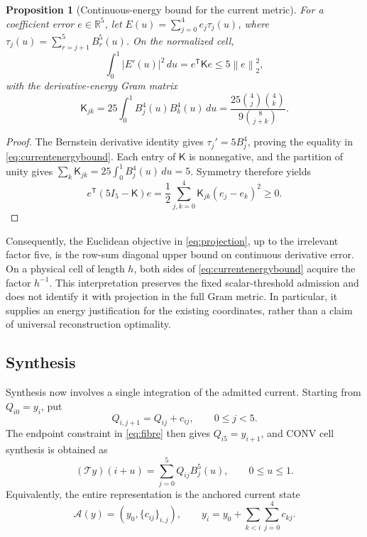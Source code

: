 \documentclass[journal]{IEEEtran}
\newtheorem{proposition}{Proposition}
\newcommand{\R}{\mathbb{R}}
\newcommand{\Tcal}{\mathcal{T}}
\newcommand{\Acal}{\mathcal{A}}
\newcommand{\norm}[1]{\left\lVert#1\right\rVert}
\begin{document}
\begin{proposition}[Continuous-energy bound for the current metric]
For a coefficient error \(e\in\R^5\), let
\(E(u)=\sum_{j=0}^4 e_j\tau_j(u)\), where
\(\tau_j(u)=\sum_{r=j+1}^5 B_r^5(u)\). On the normalized cell,
\begin{equation}
 \int_0^1 |E'(u)|^2\,du
 =e^{\mathsf T}\mathsf K e\leq5\norm{e}_2^2,
 \label{eq:currentenergybound}
\end{equation}
with the derivative-energy Gram matrix
\begin{equation}
 \mathsf K_{jk}
 =25\int_0^1 B_j^4(u)B_k^4(u)\,du
 =\frac{25\binom4j\binom4k}{9\binom8{j+k}}.
 \label{eq:currentenergygram}
\end{equation}
\end{proposition}
\begin{proof}
The Bernstein derivative identity gives \(\tau_j'=5B_j^4\), proving
the equality in \eqref{eq:currentenergybound}. Each entry of
\(\mathsf K\) is nonnegative, and the partition of unity gives
\(\sum_k\mathsf K_{jk}=25\int_0^1B_j^4(u)\,du=5\).
Symmetry therefore yields
\begin{equation}
 e^{\mathsf T}(5I_5-\mathsf K)e
 =\frac12\sum_{j,k=0}^4\mathsf K_{jk}(e_j-e_k)^2\geq0.
 \label{eq:currentenergylumping}
\end{equation}
\end{proof}
Consequently, the Euclidean objective in \eqref{eq:projection}, up to the
irrelevant factor five, is the row-sum diagonal upper bound on continuous
derivative error. On a physical cell of length \(h\), both sides of
\eqref{eq:currentenergybound} acquire the factor \(h^{-1}\).
This interpretation preserves the fixed scalar-threshold admission and
does not identify it with projection in the full Gram metric. In particular,
it supplies an energy justification for the existing coordinates, rather
than a claim of universal reconstruction optimality.

\subsection{Synthesis}

Synthesis now involves a single integration of the admitted current. Starting
from \(Q_{i0}=y_i\), put
\begin{equation}
 Q_{i,j+1}=Q_{ij}+c_{ij},\qquad 0\leq j<5.
 \label{eq:integrate}
\end{equation}
The endpoint constraint in \eqref{eq:fibre} then gives
\(Q_{i5}=y_{i+1}\), and CONV cell synthesis is obtained as
\begin{equation}
 (\Tcal y)(i+u)=\sum_{j=0}^{5}Q_{ij}B_j^5(u),
 \qquad 0\leq u\leq1.
 \label{eq:synthesis}
\end{equation}
Equivalently, the entire representation is the anchored current state
\begin{equation}
 \Acal(y)=\left(y_0,\{c_{ij}\}_{i,j}\right),\qquad
 y_i=y_0+\sum_{k<i}\sum_{j=0}^{4}c_{kj}.
 \label{eq:anchored}
\end{equation}
\end{document}
